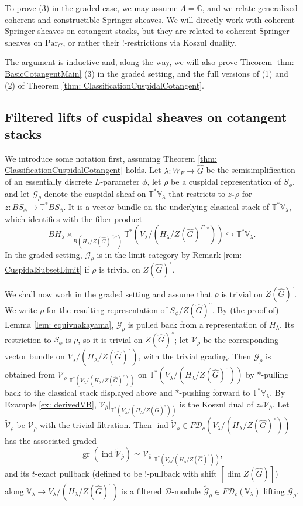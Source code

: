 \documentclass{amsart}
\theoremstyle{definition}
\theoremstyle{remark}
\numberwithin{equation}{section}
\DeclareMathOperator{\ind}{\mathrm{ind}}
\newcommand{\mc}{\mathcal}
\newcommand{\C}{\mathbb{C}}
\newcommand{\wh}{\widehat}
\newcommand{\Par}{\mathrm{Par}}
\newcommand{\V}{\mathbb{V}}
\newcommand{\T}{\mathbb{T}}
\DeclareMathOperator{\gr}{gr}
\begin{document}
To prove (3) in the graded case, we may assume $\Lambda=\C$, and we relate generalized coherent and constructible Springer sheaves. We will directly work with coherent Springer sheaves on cotangent stacks, but they are related to coherent Springer sheaves on $\Par_G$, or rather their $!$-restrictions via Koszul duality. 

The argument is inductive and, along the way, we will also prove Theorem \ref{thm: BasicCotangentMain} (3) in the graded setting, and the full versions of (1) and (2) of Theorem \ref{thm: ClassificationCuspidalCotangent}. 

\subsection{Filtered lifts of cuspidal sheaves on cotangent stacks}{\label{ss: filtered lifts}}
We introduce some notation first, assuming Theorem \ref{thm: ClassificationCuspidalCotangent} holds. Let $\lambda\colon W_F\to \wh G$ be the semisimplification of an essentially discrete $L$-parameter $\phi$, let $\rho$ be a cuspidal representation of $S_\phi$, and let $\mc G_{\rho}$ denote the cuspidal sheaf on $\T^* \V_\lambda$ that restricts to $z_*\rho$ for $z\colon BS_\phi\to \T^* BS_\phi$. It is a vector bundle on the underlying classical stack of $\T^* \V_\lambda$, which identifies with the fiber product
\[
B H_\lambda\times_{B(H_{\lambda}/Z(\wh G)^{\Gamma, \circ})}\T^* (V_\lambda/(H_{\lambda}/Z(\wh G)^{\Gamma, \circ}))\hookrightarrow
\T^* \V_\lambda.  
\]
In the graded setting, $\mc G_\rho$ is in the limit category by Remark \ref{rem: CuspidalSubsetLimit} if $\rho$ is trivial on $Z(\wh G)^\circ$.   

We shall now work in the graded setting and assume that $\rho$ is trivial on $Z(\wh G)^{\circ}$. We write $\overline{\rho}$ for the resulting representation of $S_\phi/Z(\wh G)^\circ$. By (the proof of) Lemma \ref{lem: equivnakayama}, $\mc G_\rho$ is pulled back from a representation of $H_\lambda$. Its restriction to $S_\phi$ is $\rho$, so it is trivial on $Z(\wh G)^{\circ}$; let $\mc V_{\overline\rho}$ be the corresponding vector bundle on $V_\lambda/(H_\lambda/Z(\wh G)^{\circ})$, with the trivial grading. Then $\mc G_\rho$ is obtained from $\mc V_{\overline\rho}|_{\T^* ( V_\lambda/(H_\lambda/Z(\wh G)^{\circ}))}$ on $\T^* ( V_\lambda/(H_\lambda/Z(\wh G)^{\circ}))$ by $*$-pulling back to the classical stack displayed above and $*$-pushing forward to $\T^*\V_\lambda$. By Example \ref{ex: derivedVB}, $\mc V_{\overline\rho}|_{\T^* ( V_\lambda/(H_\lambda/Z(\wh G)^{\circ}))}$ is the Koszul dual of $z_*\mc V_{\overline\rho}$. Let $\widetilde{\mc V}_{\overline\rho}$ be $\mc V_{\overline\rho}$ with the trivial filtration. Then $\ind\widetilde{\mc V}_{\overline\rho}\in F\mc D_c(V_\lambda/(H_\lambda/Z(\widehat G)^{\circ}))$ has the associated graded 
\[
\gr(\ind\widetilde{\mc V}_{\overline\rho})\simeq \mc V_{\overline\rho}|_{\T^* (V_\lambda/(H_\lambda/Z(\widehat G)^{\circ}))},
\]
and its $t$-exact pullback (defined to be $!$-pullback with shift $[\dim Z(\wh G)]$) along $\V_\lambda\to V_\lambda/(H_\lambda/Z(\wh G)^{\circ})$ is a filtered $\mc D$-module $\widetilde{\mc G}_\rho\in F\mc D_c(\V_\lambda)$ lifting $\mc G_\rho$.
\end{document}
